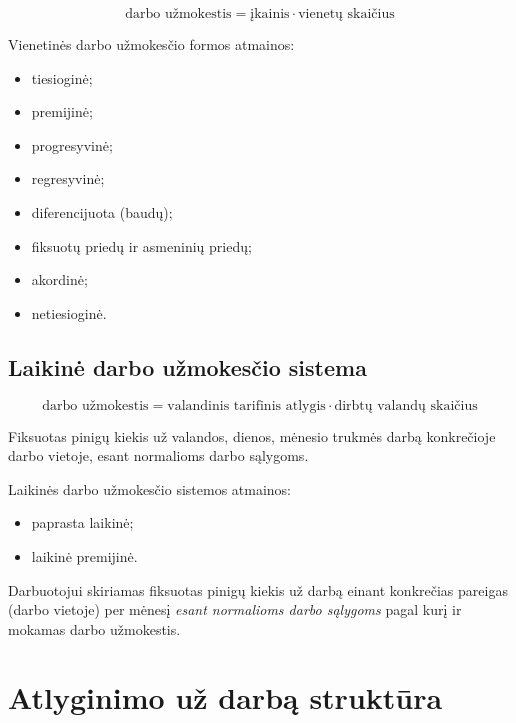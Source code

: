 \begin{equation*}
  \text{darbo užmokestis} = \text{įkainis} \cdot \text{vienetų skaičius}
\end{equation*}

Vienetinės darbo užmokesčio formos atmainos:
\begin{itemize}
  \item tiesioginė;
  \item premijinė;
  \item progresyvinė;
  \item regresyvinė;
  \item diferencijuota (baudų);
  \item fiksuotų priedų ir asmeninių priedų;
  \item akordinė;
  \item netiesioginė.
\end{itemize}

\subsection{Laikinė darbo užmokesčio sistema}

\begin{equation*}
  \text{darbo užmokestis} =
    \text{valandinis tarifinis atlygis} \cdot \text{dirbtų valandų skaičius}
\end{equation*}

\begin{defn}
  Fiksuotas pinigų kiekis už valandos, dienos, mėnesio trukmės darbą
  konkrečioje darbo vietoje, esant normalioms darbo sąlygoms.
\end{defn}

Laikinės darbo užmokesčio sistemos atmainos:
\begin{itemize}
  \item paprasta laikinė;
  \item laikinė premijinė.
\end{itemize}

\begin{defn}
  Darbuotojui skiriamas fiksuotas pinigų kiekis už darbą einant konkrečias
  pareigas (darbo vietoje) per mėnesį \emph{esant normalioms darbo
  sąlygoms} pagal kurį ir mokamas darbo užmokestis.
\end{defn}

\section{Atlyginimo už darbą struktūra}

